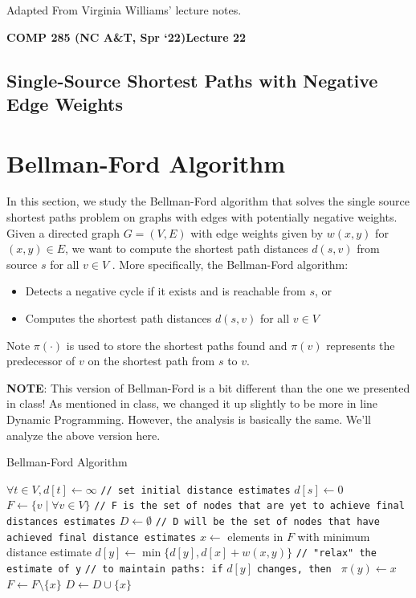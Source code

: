 \documentclass [12pt]{article}
\theoremstyle{definition}
\begin{document}
 

\vspace {1em} 
\begin {Instruction} 
Adapted From Virginia Williams' lecture notes.
\end {Instruction}  

{\LARGE \textbf {COMP 285 (NC A\&T, Spr `22)}\hfill \textbf {Lecture 22} } 

\begin{centering}
\section*{Single-Source Shortest Paths with Negative Edge Weights}
\end{centering}

\section{Bellman-Ford Algorithm} 
In this section, we study the Bellman-Ford algorithm that solves the single source shortest paths problem on graphs with edges with potentially negative weights. Given a directed graph $G = (V, E)$ with edge weights given by $w(x, y )$ for $(x, y ) \in E$, we want to compute the shortest path distances $d(s, v )$ from source $s$ for all $v \in V$ . More specifically, the Bellman-Ford algorithm: 

\begin{itemize}
  \item Detects a negative cycle if it exists and is reachable from $s$, or 
  \item Computes the shortest path distances $d(s, v )$ for all $v \in V$
\end{itemize} 

Note $\pi(\cdot)$ is used to store the shortest paths found and $\pi(v )$ represents the predecessor of $v$ on the shortest path from $s$ to $v$.

\textbf{NOTE}: This version of Bellman-Ford is a bit different than the one we presented in class! As mentioned in class, we changed it up slightly to be more in line Dynamic Programming. However, the analysis is basically the same. We'll analyze the above version here.

\begin{algorithm}
\caption{Bellman-Ford Algorithm}
\label{alg:1}
\begin{algorithmic}
\STATE $\forall t \in V, d[t] \gets \infty$ \texttt{// set initial distance estimates}
\STATE $d[s] \gets 0$
\STATE $F \gets \{v \mid \forall v \in V\}$ \texttt{// F is the set of nodes that are yet to achieve final distances estimates}
\STATE $D \gets \emptyset$ \texttt{// D will be the set of nodes that have achieved final distance estimates}
    \STATE $x \gets$ elements in $F$ with minimum distance estimate
        \STATE $d[y] \gets \min\{d[y], d[x] + w(x,y)\}$ \texttt{// "relax" the estimate of y}
        \STATE \texttt{// to maintain paths: if} $d[y]$ \texttt{changes, then } $\pi(y) \gets x$
    \ENDFOR
    \STATE $F \gets F \setminus \{x\}$
    \STATE $D \gets D \cup \{x\}$
\ENDWHILE
\end{algorithmic}
\end{algorithm}
\end{document}
